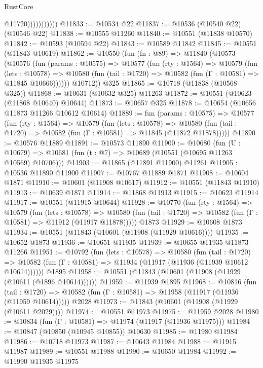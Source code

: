 \begin{lexlean}{RustCore}
\begin{coremodule}
                          @11720)))))))))))
@11833 := @10534 @22
@11837 := @10536 (@10540 @22) (@10546 @22)
@11838 := @10555 @11260
@11840 := @10551 (@11838 @10570)
@11842 := @10593 (@10594 @22)
@11843 := @10589 @11842
@11845 := @10551 (@11843 @10619)
@11862 := @10550
    (fun (fn : @89) =>
    @11840
      (@10573
        (@10576
          (fun (params : @10575) =>
          @10577
            (fun (rty : @1564) =>
            @10579
              (fun (lets : @10578) =>
              @10580 (fun (tail : @1720) => @10582 (fun (Γ : @10581) => @11845 @10666))))))
        @10712))
    @325
@11865 := @10718 (@11838 (@10568 @325))
@11868 := @10631 (@10632 @325) @11263
@11872 := @10551 (@10623 (@11868 @10640) @10644)
@11873 := @10657 @325
@11878 := @10654 (@10656 @11873 @11266 @10612 @10614)
@11889 := fun (params : @10575) =>
  @10577
    (fun (rty : @1564) =>
    @10579
      (fun (lets : @10578) =>
      @10580 (fun (tail : @1720) => @10582 (fun (Γ : @10581) => @11845 (@11872 @11878)))))
@11890 := @10576 @11889
@11891 := @10573 @11890
@11900 := @10680
    (fun (U : @10679) => @10681 (fun (t : @7) => @10689 (@10551 (@10695 @11263 @10569) @10706)))
@11903 := @11865 (@11891 @11900) @11261
@11905 := @10536 @11890 @11900
@11907 := @10767 @11889 @1871
@11908 := @10604 @1871
@11910 := @10601 (@11908 @10617)
@11912 := @10551 (@11843 @11910)
@11913 := @10639 @1871
@11914 := @11868 @11913
@11915 := @10623 @11914
@11917 := @10551 (@11915 @10644)
@11928 := @10770
    (fun (rty : @1564) =>
    @10579
      (fun (lets : @10578) =>
      @10580 (fun (tail : @1720) => @10582 (fun (Γ : @10581) => @11912 (@11917 @11878)))))
    @1873
@11929 := @10608 @1873
@11934 := @10551 (@11843 (@10601 (@11908 (@11929 @10616))))
@11935 := @10652 @1873
@11936 := @10651 @11935
@11939 := @10655 @11935 @11873 @11266
@11951 := @10792
    (fun (lets : @10578) =>
    @10580
      (fun (tail : @1720) =>
      @10582 (fun (Γ : @10581) => @11934 (@11917 (@11936 (@11939 @10612 @10614))))))
    @1895
@11958 := @10551 (@11843 (@10601 (@11908 (@11929 (@10611 (@1896 @10614))))))
@11959 := @11939 @1895
@11968 := @10816
    (fun (tail : @1720) => @10582 (fun (Γ : @10581) => @11958 (@11917 (@11936 (@11959 @10614)))))
    @2028
@11973 := @11843 (@10601 (@11908 (@11929 (@10611 @2029))))
@11974 := @10551 @11973
@11975 := @11959 @2028
@11980 := @10834 (fun (Γ : @10581) => @11974 (@11917 (@11936 @11975)))
@11984 := @10847 (@10850 (@10945 @10855)) @10630
@11985 := @11980 @11984
@11986 := @10718 @11973
@11987 := @10643 @11984
@11988 := @11915 @11987
@11989 := @10551 @11988
@11990 := @10650 @11984
@11992 := @11990 @11935 @11975

\end{coremodule}
\end{lexlean}
